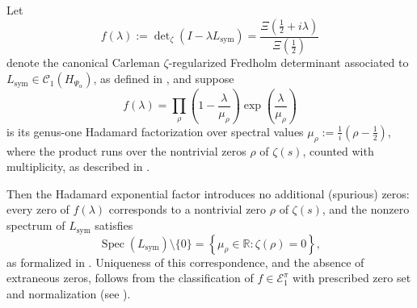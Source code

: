 \begin{lemma}
\label{lem:no_extraneous_zeros}
Let
\[
f(\lambda) := \det\nolimits_\zeta(I - \lambda L_{\mathrm{sym}}) = \frac{\Xi(\tfrac{1}{2} + i\lambda)}{\Xi(\tfrac{1}{2})}
\]
denote the canonical Carleman \(\zeta\)-regularized Fredholm determinant associated to \( L_{\mathrm{sym}} \in \mathcal{C}_1(H_{\Psi_\alpha}) \), as defined in , and suppose
\[
f(\lambda) = \prod_{\rho} \left(1 - \frac{\lambda}{\mu_\rho} \right) \exp\left( \frac{\lambda}{\mu_\rho} \right)
\]
is its genus-one Hadamard factorization over spectral values \( \mu_\rho := \frac{1}{i}(\rho - \tfrac{1}{2}) \), where the product runs over the nontrivial zeros \( \rho \) of \( \zeta(s) \), counted with multiplicity, as described in .

Then the Hadamard exponential factor introduces no additional (spurious) zeros: every zero of \( f(\lambda) \) corresponds to a nontrivial zero \( \rho \) of \( \zeta(s) \), and the nonzero spectrum of \( L_{\mathrm{sym}} \) satisfies
\[
\operatorname{Spec}(L_{\mathrm{sym}}) \setminus \{0\} = \left\{ \mu_\rho \in \mathbb{R} : \zeta(\rho) = 0 \right\},
\]
as formalized in . Uniqueness of this correspondence, and the absence of extraneous zeros, follows from the classification of \( f \in \mathcal{E}_1^\pi \) with prescribed zero set and normalization (see ).
\end{lemma}
